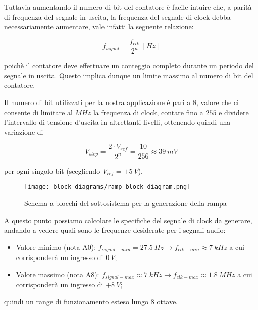 Tuttavia aumentando il numero di bit del contatore è facile intuire che, a parità di
frequenza del segnale in uscita, la frequenza del segnale di clock debba necessariamente
aumentare, vale infatti la seguente relazione:

\begin{equation}\label{fsignal}
    f_{signal}=\frac{f_{clk}}{2^n}\ [Hz]
\end{equation}

poichè il contatore deve effettuare un conteggio completo durante un periodo del segnale
in uscita. Questo implica dunque un limite massimo al numero di bit del contatore.

Il numero di bit utilizzati per la nostra applicazione è pari a $8$, valore che ci consente
di limitare al $MHz$ la frequenza di clock, contare fino a $255$ e dividere l'intervallo di
tensione d'uscita in altrettanti livelli, ottenendo quindi una variazione di

\begin{equation}\label{vstep}
    V_{step}=\frac{2\cdot V_{ref}}{2^n}=\frac{10}{256}\approx39\ mV
\end{equation}

per ogni singolo bit (scegliendo $V_{ref}=+5\ V$).

\begin{figure}[H]
    \centering
    \texttt{[image: block\_diagrams/ramp\_block\_diagram.png]}
    \caption{Schema a blocchi del sottosistema per la generazione della rampa}
    \label{ramp_block_diagram}
\end{figure}

A questo punto possiamo calcolare le specifiche del segnale di clock da generare,
andando a vedere quali sono le frequenze desiderate per i segnali audio:

\begin{itemize}
    \item Valore minimo (nota A0): $f_{signal-min}=27.5\ Hz\rightarrow f_{clk-min}\approx7\ kHz$
          a cui corrisponderà un ingresso di $0\ V$;
    \item Valore massimo (nota A8): $f_{signal-max}\approx7\ kHz\rightarrow f_{clk-max}\approx1.8\ MHz$
          a cui corrisponderà un ingresso di $+8\ V$;
\end{itemize}

quindi un range di funzionamento esteso lungo 8 ottave.



